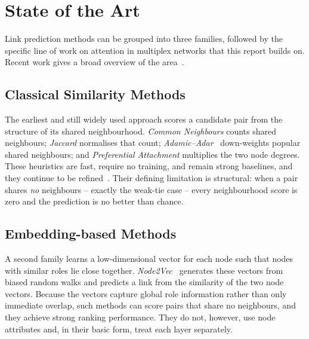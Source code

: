 \chapter{State of the Art}
\label{ch:sota}

Link prediction methods can be grouped into three families, followed by the specific line of work on
attention in multiplex networks that this report builds on. Recent work gives a broad
overview of the area~\cite{zangari2024,heuristickdd2024}.

\section{Classical Similarity Methods}
The earliest and still widely used approach scores a candidate pair from the structure of its shared
neighbourhood. \emph{Common Neighbours} counts shared neighbours; \emph{Jaccard} normalises that
count; \emph{Adamic--Adar}~\cite{adamic2003} down-weights popular shared neighbours; and
\emph{Preferential Attachment} multiplies the two node degrees. These heuristics are fast, require no
training, and remain strong baselines, and they continue to be refined~\cite{heuristickdd2024}. Their
defining limitation is structural: when a pair shares \emph{no} neighbours -- exactly the weak-tie
case -- every neighbourhood score is zero and the prediction is no better than chance.

\section{Embedding-based Methods}
A second family learns a low-dimensional vector for each node such that nodes with similar roles lie
close together. \emph{Node2Vec}~\cite{node2vec} generates these vectors from biased random walks and
predicts a link from the similarity of the two node vectors. Because the vectors capture global
role information rather than only immediate overlap, such methods can score pairs that share no
neighbours, and they achieve strong ranking performance. They do not, however, use node attributes
and, in their basic form, treat each layer separately.

